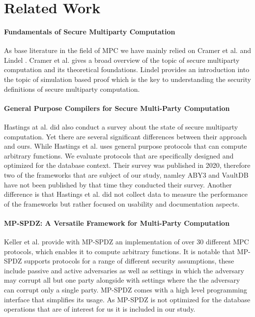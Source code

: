 \section {Related Work}
\paragraph{Fundamentals of Secure Multiparty Computation}
As base literature in the field of MPC we have mainly relied on Cramer et al. \cite{cramer2005multiparty} and Lindel \cite{lindell2017simulate}. Cramer et al. gives a broad overview of the topic of secure multiparty computation and its theoretical foundations. Lindel provides an introduction into the topic of simulation based proof which is the key to understanding the security definitions of secure multiparty computation.



\paragraph{ General Purpose Compilers for Secure Multi-Party Computation}
Hastings at al. \cite{hastings2019sok} did also conduct a survey about the state of secure multiparty computation. Yet there are several significant differences between their approach and ours. While Hastings et al. uses general purpose protocols that can compute arbitrary functions.  We evaluate protocols that are specifically designed and optimized for the database context. Their survey was published in 2020, therefore two of the frameworks that are subject of our study, namley ABY3 and VaultDB have not been published by that time they conducted their survey. Another difference is that Hastings et al. did not collect data to measure the performance of the frameworks but rather focused on usability and documentation aspects.

\paragraph{MP-SPDZ: A Versatile Framework for Multi-Party Computation}
Keller et al. \cite{hastings2019sok} provide with MP-SPDZ an implementation of over 30 different MPC protocols, which enables it  to compute arbitrary functions. It is notable that MP-SPDZ supports protocols for a range of different security assumptions, these include passive and active adversaries as well as settings in which the adversary may corrupt all but one party alongside with settings where the the adversary can corrupt only a single party. MP-SPDZ comes with a high level programming interface that simplifies its usage. As MP-SPDZ is not optimized for the database operations that are of interest for us it is included in our study. 